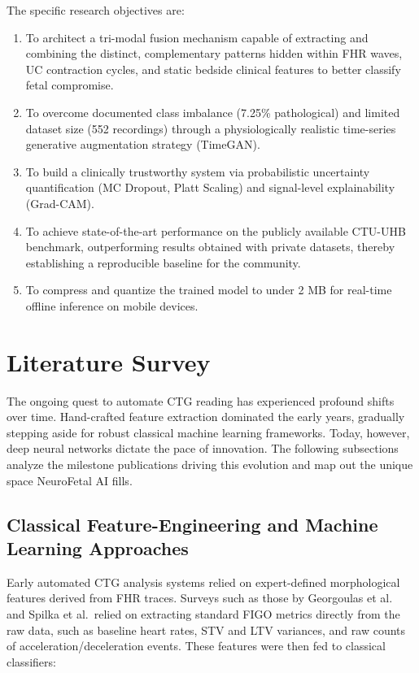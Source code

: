 \documentclass[conference]{IEEEtran}
\begin{document}
The specific research objectives are:
\begin{enumerate}
    \item To architect a tri-modal fusion mechanism capable of extracting 
    and combining the distinct, complementary patterns hidden within FHR 
    waves, UC contraction cycles, and static bedside clinical features to 
    better classify fetal compromise.
    \item To overcome documented class imbalance (7.25\% pathological) and
    limited dataset size (552 recordings) through a physiologically realistic
    time-series generative augmentation strategy (TimeGAN).
    \item To build a clinically trustworthy system via probabilistic uncertainty
    quantification (MC Dropout, Platt Scaling) and signal-level explainability
    (Grad-CAM).
    \item To achieve state-of-the-art performance on the publicly available
    CTU-UHB benchmark, outperforming results obtained with private datasets,
    thereby establishing a reproducible baseline for the community.
    \item To compress and quantize the trained model to under 2 MB for
    real-time offline inference on mobile devices.
\end{enumerate}


\section{Literature Survey}

The ongoing quest to automate CTG reading has experienced profound shifts over time. Hand-crafted feature extraction dominated the early years, gradually stepping aside for robust classical machine learning frameworks. Today, however, deep neural networks dictate the pace of innovation. The following subsections analyze the milestone publications driving this evolution and map out the unique space NeuroFetal AI fills.

\subsection{Classical Feature-Engineering and Machine Learning Approaches}

Early automated CTG analysis systems relied on expert-defined morphological
features derived from FHR traces. Surveys such as those by Georgoulas et
al.\ \cite{georgoulas2006} and Spilka et al.\ relied on extracting standard FIGO metrics directly from the raw data, such as baseline heart rates, STV and LTV variances, and raw counts of acceleration/deceleration events.
These features were then fed to classical classifiers:
\end{document}
